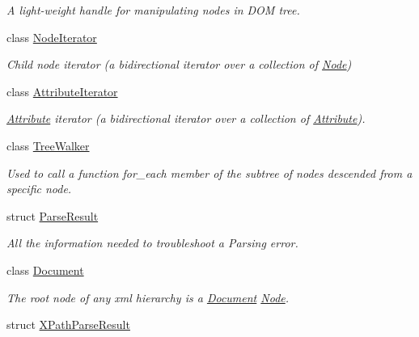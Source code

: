 \begin{DoxyCompactItemize}
\begin{DoxyCompactList}\small\item\em A light-\/weight handle for manipulating nodes in DOM tree. \item\end{DoxyCompactList}\item 
class \hyperlink{classphys_1_1xml_1_1NodeIterator}{NodeIterator}
\begin{DoxyCompactList}\small\item\em Child node iterator (a bidirectional iterator over a collection of \hyperlink{classphys_1_1xml_1_1Node}{Node}) \item\end{DoxyCompactList}\item 
class \hyperlink{classphys_1_1xml_1_1AttributeIterator}{AttributeIterator}
\begin{DoxyCompactList}\small\item\em \hyperlink{classphys_1_1xml_1_1Attribute}{Attribute} iterator (a bidirectional iterator over a collection of \hyperlink{classphys_1_1xml_1_1Attribute}{Attribute}). \item\end{DoxyCompactList}\item 
class \hyperlink{classphys_1_1xml_1_1TreeWalker}{TreeWalker}
\begin{DoxyCompactList}\small\item\em Used to call a function for\_\-each member of the subtree of nodes descended from a specific node. \item\end{DoxyCompactList}\item 
struct \hyperlink{structphys_1_1xml_1_1ParseResult}{ParseResult}
\begin{DoxyCompactList}\small\item\em All the information needed to troubleshoot a Parsing error. \item\end{DoxyCompactList}\item 
class \hyperlink{classphys_1_1xml_1_1Document}{Document}
\begin{DoxyCompactList}\small\item\em The root node of any xml hierarchy is a \hyperlink{classphys_1_1xml_1_1Document}{Document} \hyperlink{classphys_1_1xml_1_1Node}{Node}. \item\end{DoxyCompactList}\item 
struct \hyperlink{structphys_1_1xml_1_1XPathParseResult}{XPathParseResult}

\end{DoxyCompactItemize}
